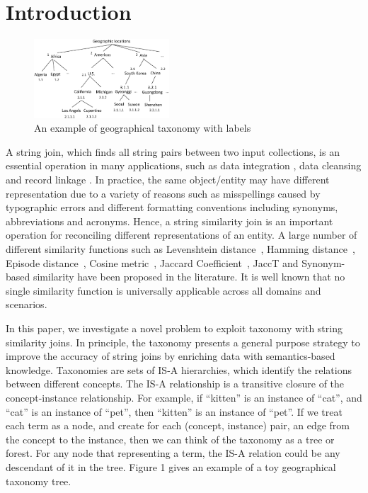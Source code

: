 \section{Introduction}

\begin{figure}[t]
\centering
\includegraphics[width=0.45\textwidth]{figures/taxonomylabels}
 \caption{An example of geographical taxonomy with labels}
\label{fig:taxonomyexample}
\end{figure}




A string join, which finds all string pairs between two input collections, is an essential operation in many applications, such as  data integration \cite{conf/sigmod/Sarawagi04}, data cleansing \cite{conf/vldb/ArasuGK06,journals/www/LiJM06} and record linkage \cite{books/Winkler99}. In practice, the same object/entity may have different representation  due to a variety of reasons such as misspellings
caused by typographic errors and different formatting conventions including synonyms, abbreviations and acronyms. Hence, a string similarity join is an important operation for reconciling different
representations of an entity. A large number of different similarity functions such as Levenshtein distance~\cite{conf/sigmod/WangLF12},
Hamming distance~\cite{conf/spire/Kondrak05}, Episode
distance~\cite{conf/ijcai/CohenRF03}, Cosine
metric~\cite{journals/ipm/SaltonB88}, Jaccard
Coefficient~\cite{conf/icde/ChaudhuriGK06,conf/icde/LiLL08}, JaccT \cite{conf/icde/ArasuCK08} and Synonym-based similarity \cite{conf/sigmod/LuLWLW13} have been proposed in the literature. It is well known
that no single similarity function is universally applicable
across all domains and scenarios.

In this paper, we investigate a novel problem to exploit taxonomy with string similarity joins. In principle, the taxonomy presents a general purpose strategy to improve the accuracy of string joins by enriching data with semantics-based knowledge. Taxonomies are sets of IS-A hierarchies, which identify the relations between different concepts. The IS-A relationship
is a transitive closure of the concept-instance relationship.
For example, if ``\textsf{kitten}'' is an instance of ``\textsf{cat}'', and
``\textsf{cat}'' is an instance of ``\textsf{pet}'', then ``\textsf{kitten}'' is an instance
of ``\textsf{pet}''. If we treat each term as a node, and create
for each (concept, instance) pair, an edge from the concept
to the instance, then we can think of the taxonomy as a tree or forest. For any node that representing a term,
the IS-A relation could be any descendant of it in the tree. Figure
1 gives an example of a toy geographical taxonomy tree.  

